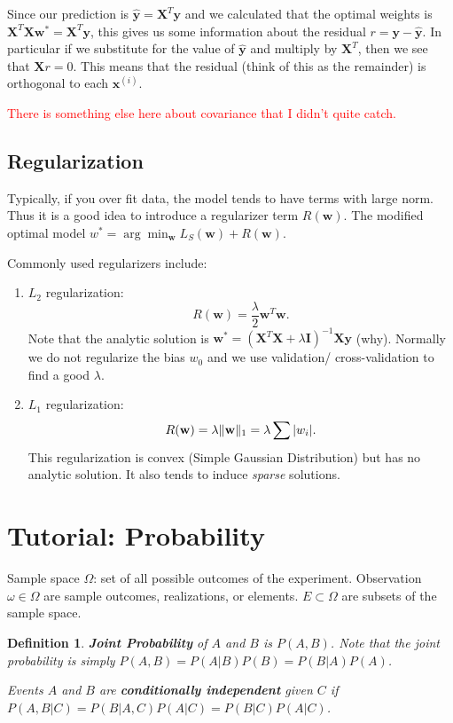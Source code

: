 \documentclass[twoside]{article}
\newtheorem{definition}[theorem]{Definition}
\newcommand\X{\mathbf{X}}
\newcommand\XT{\mathbf{X}^T}
\newcommand\y{\mathbf{y}}
\newcommand\w{\mathbf{w}}
\newcommand\I{\mathbf{I}}
\DeclarePairedDelimiter\norm{\parallel}{\parallel}
\begin{document}
Since our prediction is $\mathbf{\hat{y}} = \mathbf{X}^T\mathbf{y}$ and we calculated that the optimal weights is $\mathbf{X}^T\mathbf{X}\mathbf{w}^* = \mathbf{X}^T\mathbf{y}$, this gives us some information about the residual $r = \mathbf{y} - \mathbf{\hat{y}}$. In particular if we substitute  for the value of $\mathbf{\hat{y}}$ and multiply by $\mathbf{X}^T$, then we see that $\mathbf{X}r = 0$. This means that the residual (think of this as the remainder) is orthogonal to each $\mathbf{x}^{(i)}$.

\textcolor{red}{There is something else here about covariance that I didn't quite catch.}

\subsection{Regularization}
Typically, if you over fit data, the model tends to have terms with large norm. Thus it is a good idea to introduce a regularizer term $R(\mathbf{w})$. The modified optimal model $w^* = \arg\min_{\mathbf{w}} L_S(\mathbf{w}) + R(\mathbf{w})$.

Commonly used regularizers include:
\begin{enumerate}
\item $L_2$ regularization: 
\[R(\mathbf{w}) = \frac{\lambda}{2} \mathbf{w}^T \mathbf{w}.\]
Note that the analytic solution is $\mathbf{w}^* = (\XT\X + \lambda \I)^{-1}\X\y$ (why). Normally we do not regularize the bias $w_0$ and we use validation/ cross-validation to find a good $\lambda$.
\item $L_1$ regularization: 
\[ R(\w) = \lambda \norm{\w}_1 = \lambda \sum |w_i|.\]
This regularization is convex (Simple Gaussian Distribution) but has no analytic solution. It also tends to induce \emph{sparse} solutions. 
\end{enumerate} 

\section{Tutorial: Probability}
Sample space $\Omega$: set of all possible outcomes of the experiment. Observation $\omega \in \Omega$ are sample outcomes, realizations, or elements. $E \subset \Omega$ are subsets of the sample space.

\begin{definition}
\textbf{Joint Probability} of $A$ and $B$ is $P(A, B)$. Note that the joint probability is simply $P(A, B) = P(A|B)P(B) = P(B|A)P(A)$.

Events $A$ and $B$ are \textbf{conditionally independent} given $C$ if $P(A, B|C) = P(B|A, C)P(A|C) = P(B|C)P(A|C)$.
\end{definition}
\end{document}
